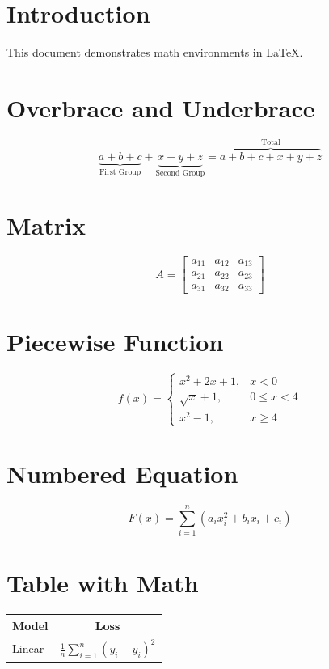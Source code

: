 ﻿\documentclass[12pt, a4paper]{article}
\begin{document}
\tableofcontents

\section{Introduction}
This document demonstrates math environments in \LaTeX{}.

\section{Overbrace and Underbrace}

\[
\underbrace{a + b + c}_{\text{First Group}} + \underbrace{x + y + z}_{\text{Second Group}} = \overbrace{a+b+c+x+y+z}^{\text{Total}}
\]

\section{Matrix}

\[
A = \begin{bmatrix}
a_{11} & a_{12} & a_{13} \\
a_{21} & a_{22} & a_{23} \\
a_{31} & a_{32} & a_{33}
\end{bmatrix}
\]

\section{Piecewise Function}

\[
f(x) = \begin{cases}
x^2 + 2x + 1, & x < 0 \\
\sqrt{x} + 1, & 0 \leq x < 4 \\
x^2 - 1, & x \geq 4
\end{cases}
\]

\section{Numbered Equation}

\begin{equation}
F(x) = \sum_{i=1}^{n} \left( a_i x_i^2 + b_i x_i + c_i \right)
\end{equation}

\section{Table with Math}

\begin{tabular}{|l|c|}
\hline
Model & Loss \\
\hline
Linear & $\frac{1}{n}\sum_{i=1}^n (y_i - \hat{y}_i)^2$ \\
\hline
\end{tabular}
\end{document}
